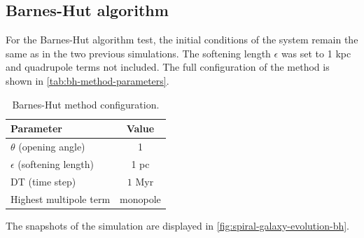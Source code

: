\subsection{Barnes-Hut algorithm}
For the Barnes-Hut algorithm test, the initial conditions of the system remain the same as in the two previous simulations.
The softening length $\epsilon$ was set to 1 kpc and quadrupole terms not included.
The full configuration of the method is shown in \autoref{tab:bh-method-parameters}.
\begin{table}[htp]
    \centering
    \begin{tabular}{|l|c|}
        \hline
        \textbf{Parameter}            & \textbf{Value} \\
        \hline
        $\theta$ (opening angle)      & 1              \\
        $\epsilon$ (softening length) & 1 pc           \\
        DT (time step)                & $1$ Myr        \\
        Highest multipole term        & monopole       \\
        \hline
    \end{tabular}
    \caption{Barnes-Hut method configuration.}
    \label{tab:bh-method-parameters}
\end{table}
The snapshots of the simulation are displayed in \autoref{fig:spiral-galaxy-evolution-bh}.
